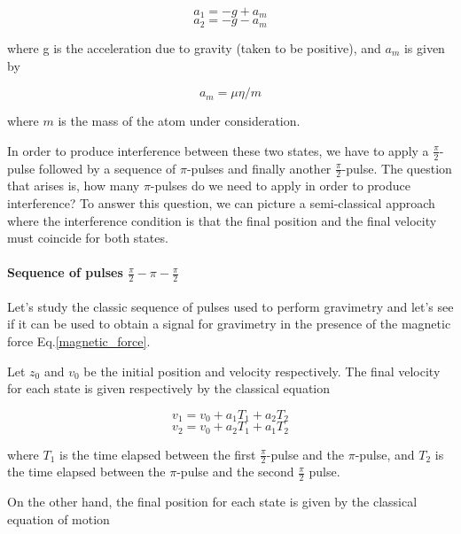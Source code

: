 \documentclass{article}
\begin{document}
\begin{equation}\label{a1}
a_{1} = -g + a_m
\end{equation}
\begin{equation}\label{a2}
a_{2} = -g - a_m
\end{equation}

where g is the acceleration due to gravity (taken to be positive), and $a_m$ is given by

\begin{equation}\label{am}
a_m = \mu \eta / m
\end{equation}

where $m$ is the mass of the atom under consideration.

In order to produce interference between these two states, we have to apply a $\frac{\pi}{2}$-pulse followed by a sequence of $\pi$-pulses and finally another $\frac{\pi}{2}$-pulse. The question that arises is, how many $\pi$-pulses do we need to apply in order to produce interference? To answer this question, we can picture a semi-classical approach where the interference condition is that the final position and the final velocity must coincide for both states.

\paragraph{Sequence of pulses $\frac{\pi}{2} - \pi - \frac{\pi}{2}$}
Let's study the classic sequence of pulses used to perform gravimetry and let's see if it can be used to obtain a signal for gravimetry in the presence of the magnetic force Eq.\ref{magnetic_force}.

Let $z_0$ and $v_0$ be the initial position and velocity respectively. The final velocity for each state is given respectively by the classical equation

\begin{equation}\label{v1_sequence_classic}
v_{1} = v_{0} + a_{1} T_{1} + a_{2} T_{2}
\end{equation}
\begin{equation}\label{v2_sequence_classic}
v_{2} = v_{0} + a_{2} T_{1} + a_{1} T_{2}
\end{equation}

where $T_{1}$ is the time elapsed between the first $\frac{\pi}{2}$-pulse and the $\pi$-pulse, and $T_{2}$ is the time elapsed between the $\pi$-pulse and the second $\frac{\pi}{2}$ pulse.

On the other hand, the final position for each state is given by the classical equation of motion
\end{document}
